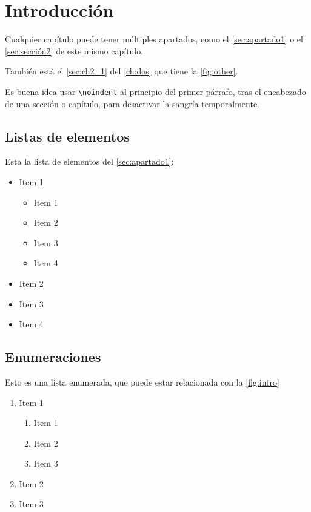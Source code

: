 \chapter{Introducción}
\label{ch:intro}

\noindent Cualquier capítulo puede tener múltiples apartados, como el \autoref{sec:apartado1} o el \autoref{sec:sección2} de este mismo capítulo.

También está el \autoref{sec:ch2_1} del \autoref{ch:dos} que tiene la \autoref{fig:other}.

Es buena idea usar \verb|\noindent| al principio del primer párrafo, tras el encabezado de una sección o capítulo, para desactivar la sangría temporalmente.

\section{Listas de elementos}
\label{sec:apartado1}

\noindent Esta la lista de elementos del \autoref{sec:apartado1}:

\begin{itemize}
    \item Item 1
    \begin{itemize}
        \item Item 1
        \item Item 2
        \item Item 3
        \item Item 4
    \end{itemize}
    
    \item Item 2
    \item Item 3
    \item Item 4
\end{itemize}

\section{Enumeraciones}
\label{sec:sección2}

\noindent Esto es una lista enumerada, que puede estar relacionada con la \autoref{fig:intro}

\begin{enumerate}
    \item Item 1
    \begin{enumerate}
        \item Item 1
        \item Item 2
        \item Item 3
    \end{enumerate}
    \item Item 2
    \item Item 3
\end{enumerate}

